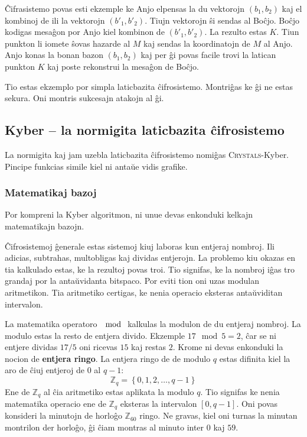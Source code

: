 \documentclass[utf8]{scrartcl}
\begin{document}
Ĉifrasistemo povas esti ekzemple ke Anjo elpensas la du vektorojn $(b_1, b_2)$
kaj el kombinoj de ili la vektorojn $(b'_1, b'_2)$. Tiujn vektorojn ŝi sendas
al Boĉjo. Boĉjo kodigas mesaĝon por Anjo kiel kombinon de $(b'_1, b'_2)$. La
rezulto estas $K$. Tiun punkton li iomete ŝovas hazarde al $M$ kaj sendas la
koordinatojn de $M$ al Anjo. Anjo konas la bonan bazon $(b_1, b_2)$ kaj per ĝi
povas facile trovi la latican punkton $K$ kaj poste rekonstrui la mesaĝon de
Boĉjo.

Tio estas ekzemplo por simpla laticbazita ĉifrosistemo. Montriĝas ke ĝi ne
estas sekura. Oni montris sukcesajn atakojn al ĝi.


\subsection{Kyber – la normigita laticbazita ĉifrosistemo}

La normigita kaj jam uzebla laticbazita ĉifrosistemo nomiĝas
\textsc{Crystals}-Kyber. Pincipe funkcias simile kiel ni antaŭe vidis grafike.


\subsubsection*{Matematikaj bazoj}

Por kompreni la Kyber algoritmon, ni unue devas enkonduki kelkajn matematikajn
bazojn.


Ĉifrosistemoj ĝenerale estas sistemoj kiuj laboras kun entjeraj
nombroj. Ili adicias, subtrahas, multobligas kaj dividas entjerojn. La problemo
kiu okazas en tia kalkulado estas, ke la rezultoj povas troi. Tio signifas, ke
la nombroj iĝas tro grandaj por la antaŭvidanta bitspaco. Por eviti tion oni
uzas modulan aritmetikon. Tia aritmetiko certigas, ke nenia operacio eksteras
antaŭviditan intervalon.

La matematika operatoro $\mod$ kalkulas la modulon de du entjeraj nombroj. La
modulo estas la resto de entjera divido. Ekzemple $17\mod 5 = 2$, ĉar se ni
entjere dividas $17 / 5$ oni ricevas $15$ kaj restas $2$. Krome ni devas
enkonduki la nocion de \textbf{entjera ringo}. La entjera ringo de de modulo
$q$ estas difinita kiel la aro de ĉiuj entjeroj de $0$ al $q-1$:
\begin{equation}
  \label{eq:entjera-ringo}
  \mathbb{Z}_q = \left\{0, 1, 2, \ldots, q-1\right\}
\end{equation}
%
Ene de $\mathbb{Z}_q$ al ĉia aritmetiko estas aplikata la modulo $q$. Tio
signifas ke nenia matematika operacio ene de $\mathbb{Z}_q$ eksteras la
intervalon $[0, q-1]$.  Oni povas konsideri la minutojn de horloĝo
$\mathbb{Z}_{60}$ ringo. Ne gravas, kiel oni turnas la minutan montrilon der
horloĝo, ĝi ĉiam montras al minuto inter $0$ kaj $59$.
\end{document}
